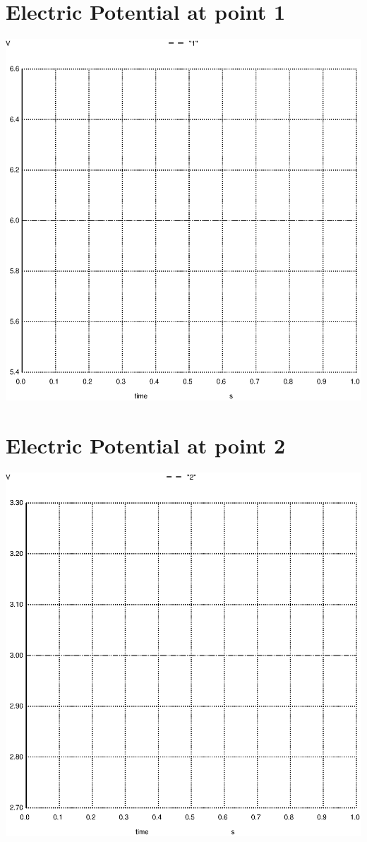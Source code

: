 \documentclass{article}
\begin{document}
\section{Electric Potential at point 1}
\includegraphics[width=\textwidth]{011.ps}
\section{Electric Potential at point 2}
\includegraphics[width=\textwidth]{012.ps}
\end{document}
